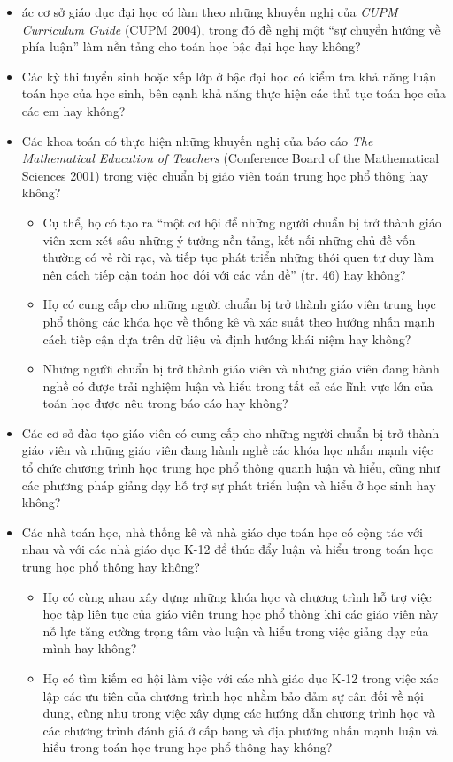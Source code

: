 \documentclass[
  10pt,
  a4paper,
  landscape,
  twoside,
  openany
]{scrbook}
\newcommand{\VI}[1]{#1}
\begin{document}
{
\VI{
  \begin{itemize}
    \item ác cơ sở giáo dục đại học có làm theo những khuyến nghị của \emph{CUPM Curriculum Guide} (CUPM 2004), trong đó đề nghị một ``sự chuyển hướng về phía luận'' làm nền tảng cho toán học bậc đại học hay không?
    \item Các kỳ thi tuyển sinh hoặc xếp lớp ở bậc đại học có kiểm tra khả năng luận toán học của học sinh, bên cạnh khả năng thực hiện các thủ tục toán học của các em hay không?
    \item Các khoa toán có thực hiện những khuyến nghị của báo cáo \emph{The Mathematical Education of Teachers} (Conference Board of the Mathematical Sciences 2001) trong việc chuẩn bị giáo viên toán trung học phổ thông hay không?
      \begin{itemize}
        \item Cụ thể, họ có tạo ra ``một cơ hội để những người chuẩn bị trở thành giáo viên xem xét sâu những ý tưởng nền tảng, kết nối những chủ đề vốn thường có vẻ rời rạc, và tiếp tục phát triển những thói quen tư duy làm nên cách tiếp cận toán học đối với các vấn đề'' (tr. 46) hay không?
        \item Họ có cung cấp cho những người chuẩn bị trở thành giáo viên trung học phổ thông các khóa học về thống kê và xác suất theo hướng nhấn mạnh cách tiếp cận dựa trên dữ liệu và định hướng khái niệm hay không?
        \item Những người chuẩn bị trở thành giáo viên và những giáo viên đang hành nghề có được trải nghiệm luận và hiểu trong tất cả các lĩnh vực lớn của toán học được nêu trong báo cáo hay không?
      \end{itemize}
    \item Các cơ sở đào tạo giáo viên có cung cấp cho những người chuẩn bị trở thành giáo viên và những giáo viên đang hành nghề các khóa học nhấn mạnh việc tổ chức chương trình học trung học phổ thông quanh luận và hiểu, cũng như các phương pháp giảng dạy hỗ trợ sự phát triển luận và hiểu ở học sinh hay không?
    \item Các nhà toán học, nhà thống kê và nhà giáo dục toán học có cộng tác với nhau và với các nhà giáo dục K-12 để thúc đẩy luận và hiểu trong toán học trung học phổ thông hay không?
      \begin{itemize}
        \item Họ có cùng nhau xây dựng những khóa học và chương trình hỗ trợ việc học tập liên tục của giáo viên trung học phổ thông khi các giáo viên này nỗ lực tăng cường trọng tâm vào luận và hiểu trong việc giảng dạy của mình hay không?
        \item Họ có tìm kiếm cơ hội làm việc với các nhà giáo dục K-12 trong việc xác lập các ưu tiên của chương trình học nhằm bảo đảm sự cân đối về nội dung, cũng như trong việc xây dựng các hướng dẫn chương trình học và các chương trình đánh giá ở cấp bang và địa phương nhấn mạnh luận và hiểu trong toán học trung học phổ thông hay không?
      \end{itemize}
  \end{itemize}}
}
\end{document}

